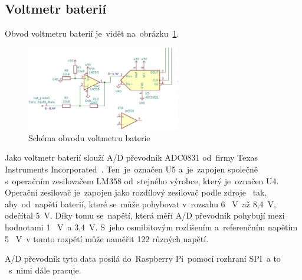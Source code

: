 \subsection{Voltmetr baterií}
Obvod voltmetru baterií je~vidět na~obrázku~\ref{fig:bat_probe}.

\begin{figure}[htb]
  \centering
  \includegraphics[width=0.6\textwidth]{img/bat_probe.jpg}
  \caption{\label{fig:bat_probe} Schéma obvodu voltmetru baterie}
\end{figure}

Jako voltmetr baterií slouží A/D převodník ADC0831 od~firmy Texas Instruments Incorporated~\cite{adc0831-dsh}. Ten~je~označen U5 a~je~zapojen společně s~operačním zesilovačem LM358 od~stejného výrobce, který je~označen U4.
Operační zesilovač je~zapojen jako rozdílový zesilovač podle zdroje~\cite{odcitacka} tak, aby~od~napětí baterií, které se~může pohybovat v~rozsahu 6 ~V~až 8,4~V, odečítal 5~V.
Díky tomu se~napětí, která měří A/D převodník pohybují mezi hodnotami 1 ~V~a 3,4~V. S~jeho osmibitovým rozlišením a~referenčním napětím 5 ~V~v tomto rozpětí může naměřit 122 různých napětí.

A/D převodník tyto data posílá do~Raspberry Pi~pomocí rozhraní SPI~a to ~s~nimi dále pracuje.
